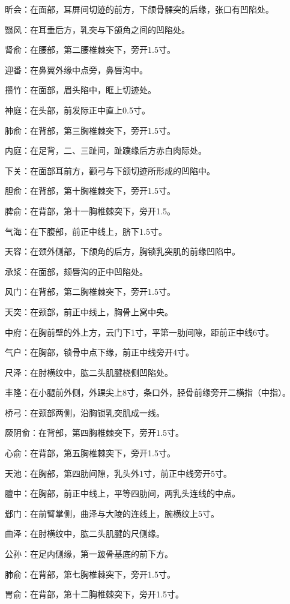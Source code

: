 \documentclass[12pt,UTF8]{ctexbook}
\begin{document}
昕会：在面部，耳屏间切迹的前方，下颌骨髁突的后缘，张口有凹陷处。

翳风：在耳垂后方，乳突与下颌角之间的凹陷处。

肾俞：在腰部，第二腰椎棘突下，旁开1.5寸。

迎番：在鼻翼外缘中点旁，鼻唇沟中。

攒竹：在面部，眉头陷中，眶上切迹处。

神庭：在头部，前发际正中直上0.5寸。

肺俞：在背部，第三胸椎棘突下，旁开1.5寸。

内庭：在足背，二、三趾间，趾蹼缘后方赤白肉际处。

下关：在面部耳前方，颧弓与下颌切迹所形成的凹陷中。

胆俞：在背部，第十胸椎棘突下，旁开1.5寸。

脾俞：在背部，第十一胸椎棘突下，旁开1.5。

气海：在下腹部，前正中线上，脐下1.5寸。

天容：在颈外侧部，下颌角的后方，胸锁乳突肌的前缘凹陷中。

承浆：在面部，颏唇沟的正中凹陷处。

风门：在背部，第二胸椎棘突下，旁开1.5寸。

天突：在颈部，前正中线上，胸骨上窝中央。

中府：在胸前壁的外上方，云门下1寸，平第一肋间隙，距前正中线6寸。

气户：在胸部，锁骨中点下缘，前正中线旁开4寸。

尺泽：在肘横纹中，肱二头肌腱桡侧凹陷处。

丰隆：在小腿前外侧，外踝尖上8寸，条口外，胫骨前缘旁开二横指（中指）。

桥弓：在颈部两侧，沿胸锁乳突肌成一线。

厥阴俞：在背部，第四胸椎棘突下，旁开1.5寸。

心俞：在背部，第五胸椎棘突下，旁开1.5寸。

天池：在胸部，第四肋间隙，乳头外1寸，前正中线旁开5寸。

膻中：在胸部，前正中线上，平等四肋间，两乳头连线的中点。

郄门：在前臂掌侧，曲泽与大陵的连线上，腕横纹上5寸。

曲泽：在肘横纹中，肱二头肌腱的尺侧缘。

公孙：在足内侧缘，第一跛骨基底的前下方。

肺俞：在背部，第七胸椎棘突下，旁开1.5寸。

胃俞：在背部，第十二胸椎棘突下，旁开1.5寸。
\end{document}

